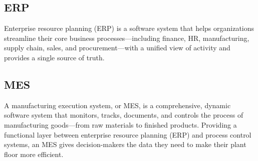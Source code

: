\subsection{ERP} Enterprise resource planning (ERP) is a software system that helps organizations streamline their core business processes—including finance, HR, manufacturing, supply chain, sales, and procurement—with a unified view of activity and provides a single source of truth. \cite{sap_erp}

\subsection{MES} A manufacturing execution system, or MES, is a comprehensive, dynamic software system that monitors, tracks, documents, and controls the process of manufacturing goods—from raw materials to finished products. Providing a functional layer between enterprise resource planning (ERP) and process control systems, an MES gives decision-makers the data they need to make their plant floor more efficient. \cite{sap_mes}